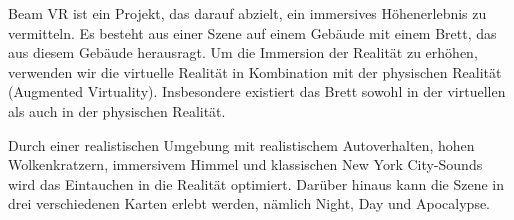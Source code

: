 Beam VR ist ein Projekt, das darauf abzielt, ein immersives Höhenerlebnis zu vermitteln.
Es besteht aus einer Szene auf einem Gebäude mit einem Brett, das aus diesem Gebäude herausragt.
Um die Immersion der Realität zu erhöhen, verwenden wir die virtuelle Realität in Kombination mit der physischen Realität (Augmented Virtuality).
Insbesondere existiert das Brett sowohl in der virtuellen als auch in der physischen Realität.

Durch einer realistischen Umgebung mit realistischem Autoverhalten, hohen Wolkenkratzern, immersivem Himmel und klassischen New York City-Sounds wird das Eintauchen in die Realität optimiert.
Darüber hinaus kann die Szene in drei verschiedenen Karten erlebt werden, nämlich Night, Day und Apocalypse.
